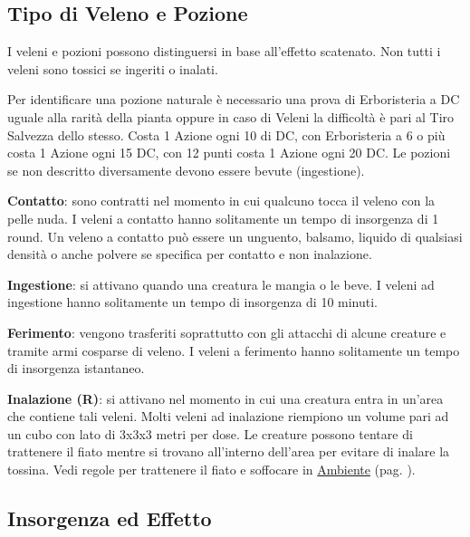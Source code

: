 \begin{multicols}{2}

\subsection{Tipo di Veleno e Pozione}\label{tipidiveleno}

I veleni e pozioni possono distinguersi in base all'effetto scatenato.
Non tutti i veleni sono tossici se ingeriti o inalati.

Per identificare una pozione naturale è necessario una prova di Erboristeria a DC uguale alla rarità della pianta oppure in caso di Veleni la difficoltà è pari al Tiro Salvezza dello stesso. Costa 1 Azione ogni 10 di DC, con Erboristeria a 6 o più costa 1 Azione ogni 15 DC, con 12 punti costa 1 Azione ogni 20 DC. Le pozioni se non descritto diversamente devono essere bevute (ingestione).

\textbf{Contatto}: sono contratti nel momento in cui qualcuno tocca il veleno con la pelle nuda. I veleni a contatto hanno solitamente un tempo di insorgenza di 1 round. Un veleno a contatto può essere un unguento, balsamo, liquido di qualsiasi densità o anche polvere se specifica per contatto e non inalazione.

\textbf{Ingestione}: si attivano quando una creatura le mangia o le beve. I veleni ad ingestione hanno solitamente un tempo di insorgenza di 10 minuti.

\textbf{Ferimento}: vengono trasferiti soprattutto con gli attacchi di alcune creature e tramite armi cosparse di veleno. I veleni a ferimento hanno solitamente un tempo di insorgenza istantaneo.

\textbf{Inalazione (R)}: si attivano nel momento in cui una creatura entra in un'area che contiene tali veleni. Molti veleni ad inalazione riempiono un volume pari ad un cubo con lato di 3x3x3 metri per dose. Le creature possono tentare di trattenere il fiato mentre si trovano all'interno dell'area per evitare di inalare la tossina.
Vedi regole per trattenere il fiato e soffocare in \hyperlink{trattenereilfiato}{Ambiente} (pag. \pageref{trattenereilfiato}).


\subsection{Insorgenza ed Effetto}\label{insorgenzaveleno}\hypertarget{insorgenzaveleno}{}


\end{multicols}
